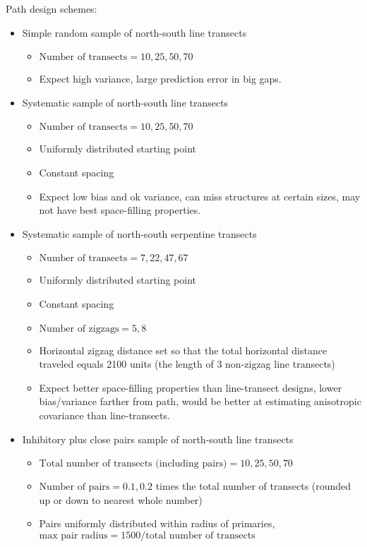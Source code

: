 \documentclass[review]{elsarticle}
\begin{document}
Path design schemes:
\begin{itemize}
\item Simple random sample of north-south line transects
\begin{itemize}
\item \(\text{Number of transects} = 10, 25, 50, 70\)
\item Expect high variance, large prediction error in big gaps.
\end{itemize}
\item Systematic sample of north-south line transects
\begin{itemize}
\item \(\text{Number of transects} = 10, 25, 50, 70\)
\item Uniformly distributed starting point
\item Constant spacing
\item Expect low bias and ok variance, can miss structures at certain sizes,
may not have best space-filling properties.
\end{itemize}
\item Systematic sample of north-south serpentine transects
\begin{itemize}
\item \(\text{Number of transects} = 7, 22, 47, 67\)
\item Uniformly distributed starting point
\item Constant spacing
\item \(\text{Number of zigzags} = 5, 8\)
\item Horizontal zigzag distance set so that the total horizontal distance
traveled equals 2100 units (the length of 3 non-zigzag line transects)
\item Expect better space-filling properties than line-transect designs,
lower bias/variance farther from path, would be better at estimating
anisotropic covariance than line-transects.
\end{itemize}
\item Inhibitory plus close pairs sample of north-south line transects
\begin{itemize}
\item \(\text{Total number of transects (including pairs)} = 10, 25, 50, 70\)
\item \(\text{Number of pairs} = 0.1, 0.2\) times the total number of transects
(rounded up or down to nearest whole number)
\item Pairs uniformly distributed within radius of primaries,
\(\text{max pair radius} = 1500 / \text{total number of transects}\)

\end{itemize}
\end{itemize}
\end{document}
